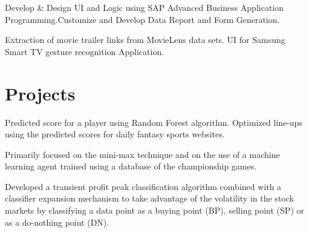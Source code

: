 \documentclass[]{Vishnu-Resume}
\begin{document}
\begin{minipage}[t]{0.66\textwidth}
\begin{tightemize}\item Develop & Design UI and Logic using SAP Advanced Business Application
Programming.Customize and Develop Data Report and Form Generation.
\end{tightemize}
\sectionsep

\begin{tightemize}\item Extraction of movie trailer links from MovieLens data sets. UI for Samsung Smart TV gesture recognition Application.
\end{tightemize}
\sectionsep

\section{Projects}
\descript{}
\location{}
Predicted score for a player using Random Forest algorithm. Optimized line-ups using the predicted
scores for daily fantasy sports websites.
\sectionsep

\location{}
Primarily focused on the mini-max technique and on the use of a machine learning agent trained
using a database of the championship games.
\sectionsep

\location{}
Developed a transient profit peak classification algorithm combined with a classifier expansion
mechanism to take advantage of the volatility in the stock markets by classifying a data point as a
buying point (BP), selling point (SP) or as a do-nothing point (DN).
\sectionsep

\end{minipage} 
\end{document}
